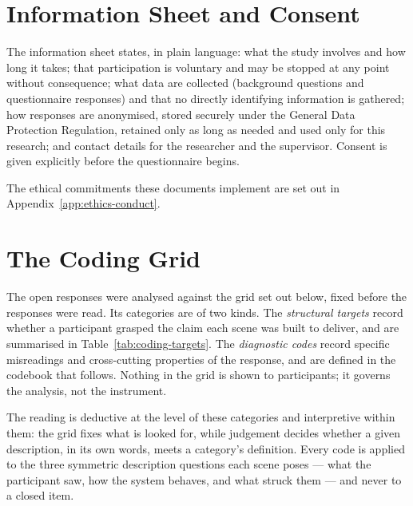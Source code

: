 \section{Information Sheet and Consent}
\label{app:b-consent}

The information sheet states, in plain language: what the study involves and how long it takes; that participation is voluntary and may be stopped at any point without consequence; what data are collected (background questions and questionnaire responses) and that no directly identifying information is gathered; how responses are anonymised, stored securely under the General Data Protection Regulation, retained only as long as needed and used only for this research; and contact details for the researcher and the supervisor. Consent is given explicitly before the questionnaire begins.


The ethical commitments these documents implement are set out in Appendix~\ref{app:ethics-conduct}.

\section{The Coding Grid}
\label{sec:app-coding-grid}

The open responses were analysed against the grid set out below, fixed before the responses were read. Its categories are of two kinds. The \emph{structural targets} record whether a participant grasped the claim each scene was built to deliver, and are summarised in Table~\ref{tab:coding-targets}. The \emph{diagnostic codes} record specific misreadings and cross-cutting properties of the response, and are defined in the codebook that follows. Nothing in the grid is shown to participants; it governs the analysis, not the instrument.

The reading is deductive at the level of these categories and interpretive within them: the grid fixes what is looked for, while judgement decides whether a given description, in its own words, meets a category's definition. Every code is applied to the three symmetric description questions each scene poses --- what the participant saw, how the system behaves, and what struck them --- and never to a closed item.

